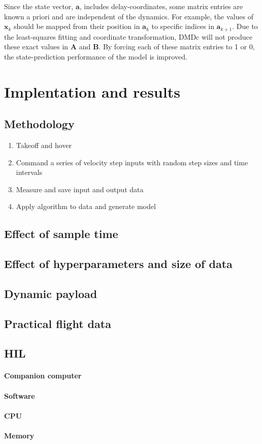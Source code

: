     Since the state vector, $\bm{a}$, includes delay-coordinates, some matrix entries are known a priori and are independent of the dynamics. 
    For example, the values of $\bm{x}_{k}$ should be mapped from their position in $\bm{a}_k$ to specific indices in $\bm{a}_{k+1}$. 
    Due to the least-squares fitting and coordinate transformation, DMDc will not produce these exact values in $\bm{A}$ and $\bm{B}$. 
    By forcing each of these matrix entries to 1 or 0, the state-prediction performance of the model is improved.




\section{Implentation and results}
    \subsection{Methodology}

        \begin{enumerate}
            \item Takeoff and hover
            \item Command a series of velocity step inputs with random step sizes and time intervals
            \item Measure and save input and output data
            \item Apply algorithm to data and generate model
        \end{enumerate}
    
    \subsection{Effect of sample time}
    \subsection{Effect of hyperparameters and size of data}
    \subsection{Dynamic payload}
    \subsection{Practical flight data}
    \subsection{HIL}
        \paragraph{Companion computer}
        \paragraph{Software}
        \paragraph{CPU}
        \paragraph{Memory}

